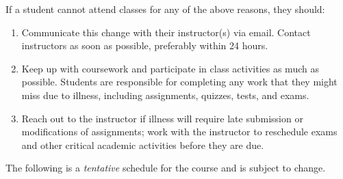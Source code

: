 \documentclass[11pt,letterpaper]{article}
\begin{document}
\newpage

If a student cannot attend classes for any of the above reasons, they should:

\begin{enumerate}[1.]
\item Communicate this change with their instructor(s) via email. Contact instructors as soon as possible, preferably within 24 hours.

\item Keep up with coursework and participate in class activities as much as possible. Students are responsible for completing any work that they might miss due to illness, including assignments, quizzes, tests, and exams.

\item Reach out to the instructor if illness will require late submission or modifications of assignments; work with the instructor to reschedule exams and other critical academic activities before they are due.
\end{enumerate}
\sectionbreak





The following is a \emph{tentative} schedule for the course and is subject to change. 
        \begin{table}[!ht]
        \centering
        \end{table}
\end{document}
